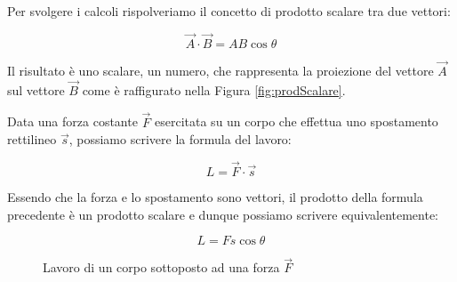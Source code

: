 Per svolgere i calcoli rispolveriamo il concetto di prodotto scalare tra due vettori:

\begin{equation*}
    \vec{A}\cdot \vec{B} = AB\cos\theta
\end{equation*}

Il risultato è uno scalare, un numero, che rappresenta la proiezione del vettore $\vec{A}$ sul vettore $\vec{B}$ come è raffigurato nella Figura \ref{fig:prodScalare}.

Data una forza costante $\vec{F}$ esercitata su un corpo che effettua uno spostamento rettilineo $\vec{s}$, possiamo scrivere la formula del lavoro:

\begin{equation*}
    L = \vec{F} \cdot \vec{s}
\end{equation*}

Essendo che la forza e lo spostamento sono vettori, il prodotto della formula precedente è un prodotto scalare e dunque possiamo scrivere equivalentemente:

\begin{equation}
    L = Fs\cos\theta
    \label{lavoroForzaConst}
\end{equation}

\begin{figure}[H]
    \centering
    
    \caption{Lavoro di un corpo sottoposto ad una forza $\vec{F}$}
    \label{fig:lavoroCorpoSottopostoForza}
\end{figure}

